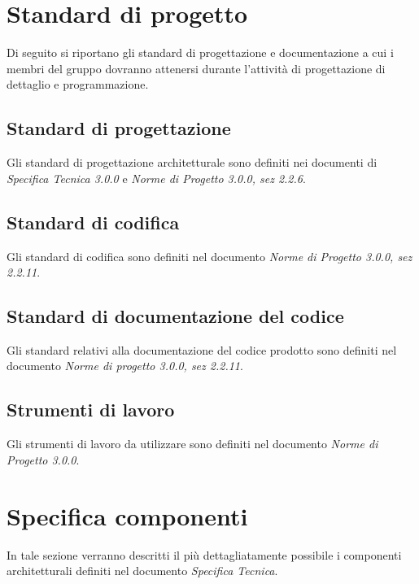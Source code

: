 \documentclass[a4paper]{article}
\begin{document}
	\newpage	
	
	\section{Standard di progetto}
		Di seguito si riportano gli standard di progettazione e documentazione a cui i membri del gruppo dovranno attenersi durante l'attività di progettazione di dettaglio e programmazione.
	\subsection{Standard di progettazione}
		Gli standard di progettazione architetturale sono definiti nei documenti di \emph{Specifica Tecnica 3.0.0} e \emph{Norme di Progetto 3.0.0, sez 2.2.6}.  
	\subsection{Standard di codifica}
		Gli standard di codifica sono definiti nel documento \emph{Norme di Progetto 3.0.0, sez 2.2.11}.
	\subsection{Standard di documentazione del codice}
		Gli standard relativi alla documentazione del codice prodotto sono definiti nel documento \emph{Norme di progetto 3.0.0, sez 2.2.11}.
	\subsection{Strumenti di lavoro}
		Gli strumenti di lavoro da utilizzare sono definiti nel documento \emph{Norme di Progetto 3.0.0}.
		
	\newpage
	
	\section{Specifica componenti}
		In tale sezione verranno descritti il più dettagliatamente possibile i componenti architetturali definiti nel documento \emph{Specifica Tecnica}.
		
\end{document}
